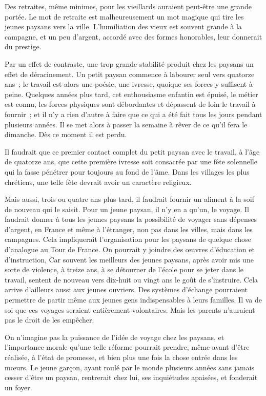 \documentclass[french,twoside]{book} %
\begin{document}
Des retraites, même minimes, pour les vieillards auraient peut-être une grande portée. Le mot de retraite est malheureusement un mot magique qui tire les jeunes paysans vers la ville. L'humiliation des vieux est souvent grande à la campagne, et un peu d'argent, accordé avec des formes honorables, leur donnerait du prestige.\par
Par un effet de contraste, une trop grande stabilité produit chez les paysans un effet de déracinement. Un petit paysan commence à labourer seul vers quatorze ans ; le travail est alors une poésie, une ivresse, quoique ses forces y suffisent à peine. Quelques années plus tard, cet enthousiasme enfantin est épuisé, le métier est connu, les forces physiques sont débordantes et dépassent de loin le travail à fournir ; et il n'y a rien d'autre à faire que ce qui a été fait tous les jours pendant plusieurs années. Il se met alors à passer la semaine à rêver de ce qu'il fera le dimanche. Dès ce moment il est perdu.\par
Il faudrait que ce premier contact complet du petit paysan avec le travail, à l'âge de quatorze ans, que cette première ivresse soit consacrée par une fête solennelle qui la fasse pénétrer pour toujours au fond de l'âme. Dans les villages les plus chrétiens, une telle fête devrait avoir un caractère religieux.\par
Mais aussi, trois ou quatre ans plus tard, il faudrait fournir un aliment à la soif de nouveau qui le saisit. Pour un jeune paysan, il n'y en a qu'un, le voyage. Il faudrait donner à tous les jeunes paysans la possibilité de voyager sans dépenses d'argent, en France et même à l'étranger, non pas dans les villes, mais dans les campagnes. Cela impliquerait l'organisation pour les paysans de quelque chose d'analogue au Tour de France. On pourrait y joindre des œuvres d'éducation et d'instruction, Car souvent les meilleurs des jeunes paysans, après avoir mis une sorte de violence, à treize ans, à se détourner de l'école pour se jeter dans le travail, sentent de nouveau vers dix-huit ou vingt ans le goût de s'instruire. Cela arrive d'ailleurs aussi aux jeunes ouvriers. Des systèmes d'échange pourraient permettre de partir même aux jeunes gens indispensables à leurs familles. Il va de soi que ces voyages seraient entièrement volontaires. Mais les parents n'auraient pas le droit de les empêcher.\par
On n'imagine pas la puissance de l'idée de voyage chez les paysans, et l'importance morale qu'une telle réforme pourrait prendre, même avant d'être réalisée, à l'état de promesse, et bien plus une fois la chose entrée dans les mœurs. Le jeune garçon, ayant roulé par le monde plusieurs années sans jamais cesser d'être un paysan, rentrerait chez lui, ses inquiétudes apaisées, et fonderait un foyer.\par
\end{document}
